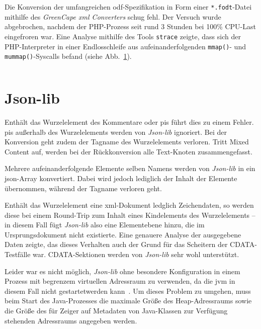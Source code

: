 Die Konversion der umfangreichen \acrshort{odf}-Spezifikation in Form einer \texttt{*.fodt}-Datei mithilfe des \emph{GreenCape \acrshort{xml} Converters} schug fehl. Der Versuch wurde abgebrochen, nachdem der PHP-Prozess seit rund 3 Stunden bei 100\% CPU-Last eingefroren war. Eine Analyse mithilfe des Tools \texttt{strace} zeigte, dass sich der PHP-Interpreter in einer Endlosschleife aus aufeinanderfolgenden \texttt{mmap()}- und \texttt{mummap()}-Syscalls befand (siehe Abb.~\ref{fig:greencapeloop}).

\begin{figure}[h!]
    \inputminted{shell-session}{greencapexml-strace.txt}
    \label{fig:greencapeloop}
\end{figure}

\section{Json-lib}
\label{sec:jsonlib}

Enthält das Wurzelelement des Kommentare oder \glspl{pi} führt dies zu einem Fehler. \glspl{pi} außerhalb des Wurzelelements werden von \emph{Json-lib} ignoriert. Bei der Konversion geht zudem der Tagname des Wurzelelements verloren. Tritt Mixed Content auf, werden bei der Rückkonversion alle Text-Knoten zusammengefasst.

Mehrere aufeinanderfolgende Elemente selben Namens werden von \emph{Json-lib} in ein \acrshort{json}-Array konvertiert. Dabei wird jedoch lediglich der Inhalt der Elemente übernommen, während der Tagname verloren geht.

Enthält das Wurzelelement eine \acrshort{xml}-Dokument ledglich Zeichendaten, so werden diese bei einem Round-Trip zum Inhalt eines Kindelements des Wurzelelements -- in diesem Fall fügt \emph{Json-lib} also eine Elementebene hinzu, die im Ursprungsdokument nicht existierte. Eine genauere Analyse der ausgegebene Daten zeigte, das dieses Verhalten auch der Grund für das Scheitern der CDATA-Testfälle war. CDATA-Sektionen werden von \emph{Json-lib} sehr wohl unterstützt.

Leider war es nicht möglich, \emph{Json-lib} ohne besondere Konfiguration in einem Prozess mit begrenzem virtuellen Adressraum zu verwenden, da die \acrfull{jvm} in diesem Fall nicht gestartetwerden kann~\cite{jvmmemlimit}. Um dieses Problem zu umgehen, muss beim Start des Java-Prozesses die maximale Größe des Heap-Adressraums sowie die Größe des für Zeiger auf Metadaten von Java-Klassen zur Verfügung stehenden Adressraums angegeben werden.

